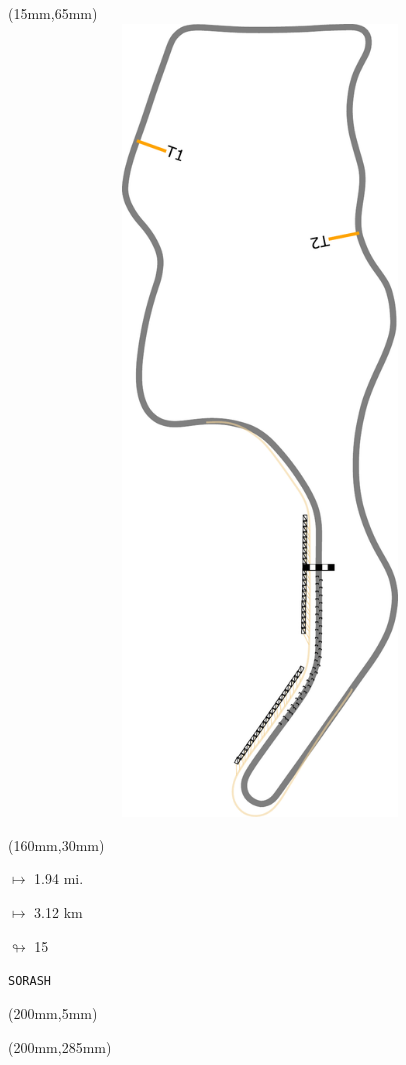 \begin{textblock*}{185mm}(15mm,65mm)%
\centering
\mbox{\includegraphics[width=185mm,height=210mm,keepaspectratio]{PT/SORASH.pdf}}
\end{textblock*}
\begin{textblock*}{40mm}(160mm,30mm)%
\Large
\par$\mapsto$ 1.94 mi.
\par$\mapsto$ 3.12 km
\par$\looparrowright$ 15
\par\hfill\tiny\tt SORASH\\
\end{textblock*}
\begin{textblock*}{20mm}(200mm,5mm)%
\fbox{\thepage}
\label{SORASH}
\end{textblock*}
\begin{textblock*}{20mm}(200mm,285mm)%
\fbox{\thepage}
\end{textblock*}

